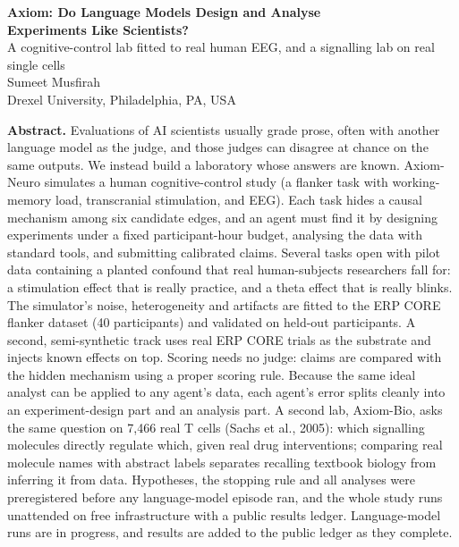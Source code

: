 \documentclass[11pt]{article}
\begin{document}
\begin{center}
{\Large\bfseries Axiom: Do Language Models Design and Analyse\\[2pt] Experiments Like Scientists?}\\[8pt]
{\large A cognitive-control lab fitted to real human EEG, and a signalling lab on real single cells}\\[14pt]
Sumeet Musfirah\\[2pt]
{\small Drexel University, Philadelphia, PA, USA}
\end{center}
\vspace{10pt}
\noindent\textbf{Abstract.}
Evaluations of AI scientists usually grade prose, often with another language model as the judge, and those judges can disagree at chance on the same outputs.
We instead build a laboratory whose answers are known.
Axiom-Neuro simulates a human cognitive-control study (a flanker task with working-memory load, transcranial stimulation, and EEG).
Each task hides a causal mechanism among six candidate edges, and an agent must find it by designing experiments under a fixed participant-hour budget, analysing the data with standard tools, and submitting calibrated claims.
Several tasks open with pilot data containing a planted confound that real human-subjects researchers fall for: a stimulation effect that is really practice, and a theta effect that is really blinks.
The simulator's noise, heterogeneity and artifacts are fitted to the ERP CORE flanker dataset (40 participants) and validated on held-out participants.
A second, semi-synthetic track uses real ERP CORE trials as the substrate and injects known effects on top.
Scoring needs no judge: claims are compared with the hidden mechanism using a proper scoring rule.
Because the same ideal analyst can be applied to any agent's data, each agent's error splits cleanly into an experiment-design part and an analysis part.
A second lab, Axiom-Bio, asks the same question on 7,466 real T cells (Sachs et al., 2005): which signalling molecules directly regulate which, given real drug interventions; comparing real molecule names with abstract labels separates recalling textbook biology from inferring it from data.
Hypotheses, the stopping rule and all analyses were preregistered before any language-model episode ran, and the whole study runs unattended on free infrastructure with a public results ledger.
Language-model runs are in progress, and results are added to the public ledger as they complete.

\vspace{14pt}
\end{document}
